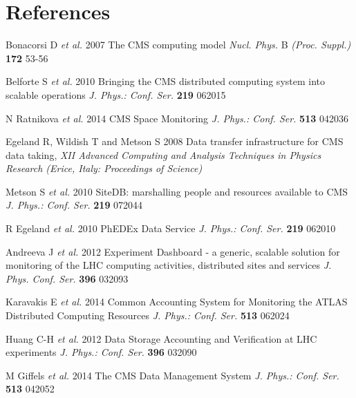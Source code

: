 \section*{References}

\begin{thebibliography}{1}

 Bonacorsi D {\it et al.} 2007 The CMS computing model 
{\it Nucl. Phys.} B {\it (Proc. Suppl.)} {\bf 172} 53-56

 Belforte S {\it et al.} 2010 Bringing the CMS distributed computing system into scalable operations 
{\it J. Phys.: Conf. Ser.} {\bf 219} 062015

N Ratnikova {\it et al.} 2014 CMS Space Monitoring {\it J. Phys.: Conf. Ser.} {\bf 513} 042036 

  Egeland R, Wildish T and Metson S 2008 Data transfer infrastructure for CMS data taking,  
{\it XII Advanced Computing and Analysis Techniques in Physics Research (Erice, Italy: Proceedings of Science)}



Metson S {\it et al.} 2010 SiteDB: marshalling people and resources available to CMS
{\it J. Phys.: Conf. Ser.} {\bf 219} 072044


 R Egeland {\it et al.} 2010  PhEDEx Data Service 
{\it J. Phys.: Conf. Ser.} {\bf 219} 062010

  Andreeva J {\it et al.} 2012 Experiment Dashboard - a generic, scalable solution for 
monitoring of the LHC computing activities, distributed sites and services 
{\it J. Phys. Conf. Ser.} {\bf 396} 032093


Karavakis E {\it et al.}  2014 Common Accounting System for Monitoring the ATLAS 
Distributed Computing Resources
{\it J. Phys.: Conf. Ser.} {\bf 513} 062024

Huang C-H {\it et al.} 2012 Data Storage Accounting and Verification at LHC experiments 
{\it J. Phys.: Conf. Ser.} {\bf 396} 032090

M Giffels {\it et al.} 2014 The CMS Data Management System {\it J. Phys.: Conf. Ser.} {\bf 513} 042052


\end{thebibliography}
